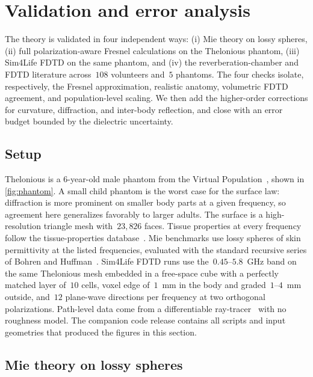 \documentclass[journal,twocolumn,10pt]{IEEEtran}
\begin{document}
\section{Validation and error analysis}\label{sec:val}

The theory is validated in four independent ways: (i) Mie theory on
lossy spheres, (ii) full polarization-aware Fresnel calculations on
the Thelonious phantom, (iii) Sim4Life FDTD on the same phantom, and
(iv) the reverberation-chamber and FDTD literature across~$108$
volunteers and~$5$ phantoms. The four checks isolate, respectively, the
Fresnel approximation, realistic anatomy, volumetric FDTD agreement,
and population-level scaling. We then add the higher-order corrections
for curvature, diffraction, and inter-body reflection, and close with an
error budget bounded by the dielectric uncertainty.

\subsection{Setup}\label{subsec:val-setup}

Thelonious is a 6-year-old male phantom from the Virtual
Population~\cite{ITISv5}, shown in \cref{fig:phantom}. A small child
phantom is the worst case for the surface law: diffraction is more
prominent on smaller body parts at a given frequency, so agreement
here generalizes favorably to larger adults. The surface is
a high-resolution triangle mesh with~$23{,}826$ faces. Tissue
properties at every frequency follow the tissue-properties
database~\cite{ITISv5,Gabriel1996}. Mie
benchmarks use lossy spheres of skin permittivity at the listed
frequencies, evaluated with the standard recursive series of Bohren
and Huffman~\cite{BohrenHuffman1983}. Sim4Life FDTD runs use the~$0.45$--$5.8$~GHz band on the same
Thelonious mesh embedded in a free-space cube with a perfectly matched
layer of~$10$ cells, voxel edge of~$1$~mm in the body and
graded~$1$--$4$~mm outside, and~$12$ plane-wave directions per
frequency at two orthogonal polarizations. Path-level data come from a
differentiable ray-tracer~\cite{SionnaRT} with no roughness model. The
companion code release contains all scripts and input geometries that
produced the figures in this section.

\subsection{Mie theory on lossy spheres}\label{subsec:val-mie}
\end{document}
